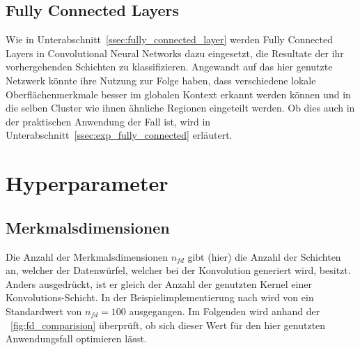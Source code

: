 \subsection{Fully Connected Layers}
\label{ssec:network_architecture_fully_connected}

Wie in Unterabschnitt~\ref{ssec:fully_connected_layer} werden Fully Connected Layers in Convolutional Neural Networks dazu eingesetzt, die Resultate der ihr vorhergehenden Schichten zu klassifizieren. Angewandt auf das hier genutzte Netzwerk könnte ihre Nutzung zur Folge haben, dass verschiedene lokale Oberflächenmerkmale besser im globalen Kontext erkannt werden können und \ggf in die selben Cluster wie ihnen ähnliche Regionen eingeteilt werden. Ob dies auch in der praktischen Anwendung der Fall ist, wird in Unterabschnitt~\ref{ssec:exp_fully_connected} erläutert.


\iffalse

\section{Hyperparameter}
\label{sec:hyperparameter}


\subsection{Merkmalsdimensionen}

Die Anzahl der Merkmalsdimensionen $n_{fd}$ gibt (hier) die Anzahl der Schichten an, welcher der Datenwürfel, welcher bei der Konvolution generiert wird, besitzt. Anders ausgedrückt, ist er gleich der Anzahl der genutzten Kernel einer Konvolutions-Schicht. In der Beispielimplementierung nach \cite{kanezaki_18} wird von ein Standardwert von $n_{fd} = 100$ ausgegangen. Im Folgenden wird anhand der \figurename~\ref{fig:fd_comparision} überprüft, ob sich dieser Wert für den hier genutzten Anwendungsfall optimieren lässt.


